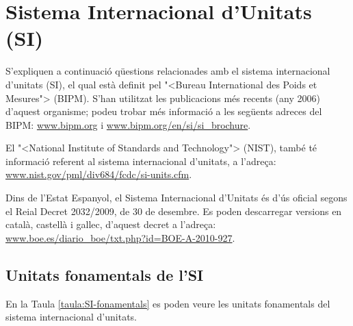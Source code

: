 \chapter{Sistema Internacional d'Unitats (SI)}\label{sec:SI}

S'expliquen a continuaci\'{o} q\"{u}estions relacionades amb el sistema
internacional d'unitats (SI), el qual est\`{a} definit pel {"<}Bureau
International des Poids et Mesures{">} (\textsf{BIPM}). S'han utilitzat les publicacions m\'{e}s recents (any 2006) d'aquest organisme; podeu trobar m\'{e}s informaci\'{o} a les seg\"{u}ents adreces del \textsf{BIPM}: \href{http://www.bipm.org/}{www.bipm.org} i
\href{http://www.bipm.org/en/si/si_brochure/}{www.bipm.org/en/si/si\_brochure}.

El {"<}National Institute of Standards and Technology{">} (\textsf{NIST}), tamb\'{e} t\'{e} informaci\'{o} referent al sistema
internacional d'unitats, a l'adre\c{c}a: \href{http://www.nist.gov/pml/div684/fcdc/si-units.cfm}
{www.nist.gov/pml/div684/fcdc/si-units.cfm}.

Dins de l'Estat Espanyol, el Sistema Internacional d'Unitats \'{e}s d'\'{u}s oficial segons el Reial Decret 2032/2009, de 30 de desembre. Es poden descarregar versions en catal\`{a}, castell\`{a} i gallec, d'aquest decret a l'adre\c{c}a: \href{http://www.boe.es/diario_boe/txt.php?id=BOE-A-2010-927}
{www.boe.es/diario\_boe/txt.php?id=BOE-A-2010-927}.


\section{Unitats fonamentals de l'SI}

En la Taula \vref{taula:SI-fonamentals} es poden veure les unitats
fonamentals del sistema internacional d'unitats.


